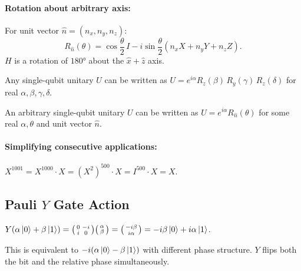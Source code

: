 \documentclass[10pt,a4paper]{article}
\begin{document}
\paragraph{Rotation about arbitrary axis:} For unit vector $\hat{n}=(n_x,n_y,n_z)$:
\[
R_{\hat{n}}(\theta)=\cos\frac{\theta}{2}\,I - i\sin\frac{\theta}{2}(n_x X+n_y Y+n_z Z).
\]
$H$ is a rotation of $180°$ about the $\hat{x}+\hat{z}$ axis.

\begin{tcolorbox}[propstyle, title={Theorem: $Z$--$Y$ Decomposition}]
Any single-qubit unitary $U$ can be written as $U=e^{i\alpha}R_z(\beta)\,R_y(\gamma)\,R_z(\delta)$ for real $\alpha,\beta,\gamma,\delta$.
\end{tcolorbox}

\begin{tcolorbox}[propstyle, title={Theorem: Arbitrary Unitary Operator}]
An arbitrary single-qubit unitary $U$ can be written as $U=e^{i\alpha}R_{\hat{n}}(\theta)$ for some real $\alpha,\theta$ and unit vector $\hat{n}$.
\end{tcolorbox}





\paragraph{Simplifying consecutive applications:} $X^{1001}=X^{1000}\cdot X=(X^2)^{500}\cdot X=I^{500}\cdot X=X$.

\subsection{Pauli $Y$ Gate Action}

$Y(\alpha\ket{0}+\beta\ket{1})=\bigl(\begin{smallmatrix}0&-i\\i&0\end{smallmatrix}\bigr)\bigl(\begin{smallmatrix}\alpha\\\beta\end{smallmatrix}\bigr)=\bigl(\begin{smallmatrix}-i\beta\\i\alpha\end{smallmatrix}\bigr)=-i\beta\ket{0}+i\alpha\ket{1}$.

This is equivalent to $-i(\alpha\ket{0}-\beta\ket{1})$ with different phase structure. $Y$ flips both the bit and the relative phase simultaneously.
\end{document}

